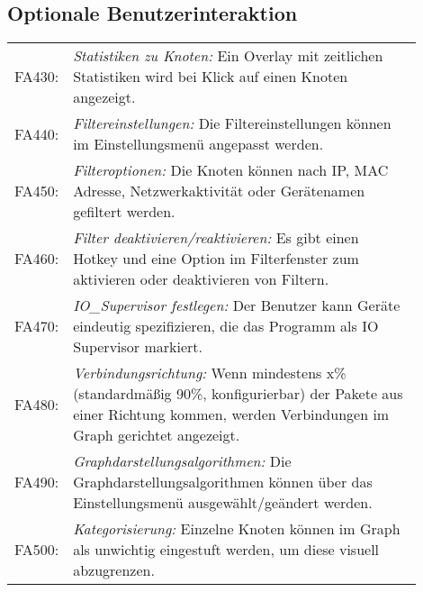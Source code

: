 \subsection{Optionale Benutzerinteraktion}

\begin{tabular}{lp{0.9\linewidth}}

FA430: & \textit{Statistiken zu Knoten: }Ein Overlay mit zeitlichen Statistiken wird bei Klick auf einen Knoten angezeigt. \\

FA440: & \textit{Filtereinstellungen: }Die Filtereinstellungen können im Einstellungsmenü angepasst werden. \\

FA450: & \textit{Filteroptionen: }Die Knoten können nach IP, MAC Adresse, Netzwerkaktivität oder Gerätenamen gefiltert werden. \\

FA460: & \textit{Filter deaktivieren/reaktivieren: }Es gibt einen Hotkey und eine Option im Filterfenster zum aktivieren oder deaktivieren von Filtern. \\

FA470: & \textit{IO\_Supervisor festlegen: }Der Benutzer kann Geräte eindeutig spezifizieren, die das Programm als IO Supervisor markiert. \\ %

FA480: & \textit{Verbindungsrichtung: }Wenn mindestens x\% (standardmäßig 90\%, konfigurierbar) der Pakete aus einer Richtung kommen, werden Verbindungen im Graph gerichtet angezeigt. \\

FA490: & \textit{Graphdarstellungsalgorithmen: }Die Graphdarstellungsalgorithmen können über das Einstellungsmenü ausgewählt/geändert werden. \\

FA500: & \textit{Kategorisierung: }Einzelne Knoten können im Graph als unwichtig eingestuft werden, um diese visuell abzugrenzen. \\
\end{tabular}
